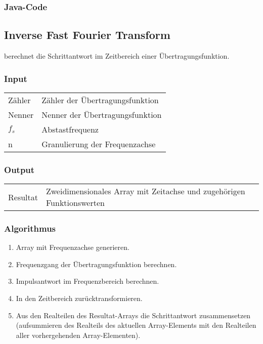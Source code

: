 \subsubsection*{Java-Code}



\clearpage
\subsection{Inverse Fast Fourier Transform}
\label{app:algo:ifft}

  berechnet   die  Schrittantwort  im   Zeitbereich  einer
\"Ubertragungsfunktion. 

\subsubsection*{Input}

\begin{tabular}{p{40mm}l}
    Z\"ahler & Z\"ahler der \"Ubertragungsfunktion                             \\
    Nenner   & Nenner der \"Ubertragungsfunktion                               \\
    $f_s$    & Abstastfrequenz                                                 \\
    n        & Granulierung der Frequenzachse
\end{tabular}

\subsubsection*{Output}
\begin{tabular}{p{40mm}l}
    Resultat & \parbox[t][4em][s]{0.7\textwidth}{Zweidimensionales Array mit Zeitachse und zugeh\"origen Funktionswerten}
\end{tabular}

\subsubsection*{Algorithmus}
\begin{enumerate}
    \item
        Array mit Frequenzachse generieren.
    \item
        Frequenzgang der \"Ubertragungsfunktion berechnen.
    \item
        Impulsantwort im Frequenzbereich berechnen.
    \item
        In den Zeitbereich zur\"ucktransformieren.
    \item
        Aus   den   Realteilen    des   Resultat-Arrays   die   Schrittantwort
        zusammensetzen    (aufsummieren    des   Realteils    des    aktuellen
        Array-Elements    mit    den     Realteilen    aller    vorhergehenden
        Array-Elementen).
\end{enumerate}

